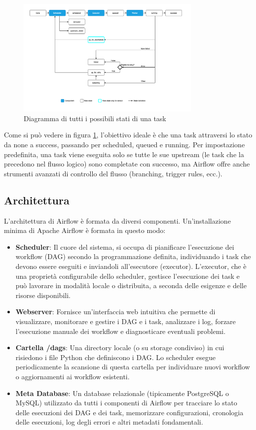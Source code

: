 \begin{figure}[h]
    \centering
    \includegraphics[width=0.8\textwidth]{img/task_lifecycle_diagram.png}
    \caption{Diagramma di tutti i possibili stati di una task}
    \label{fig:task_lifecycle}
\end{figure}

Come si può vedere in figura \ref{fig:task_lifecycle}, l'obiettivo ideale è che una task attraversi lo stato da none a success, passando per scheduled, queued e running. Per impostazione predefinita, una task viene eseguita solo se tutte le sue upstream (le task che la precedono nel flusso logico) sono completate con successo, ma Airflow offre anche strumenti avanzati di controllo del flusso (branching, trigger rules, ecc.).


\subsection{Architettura}
\label{sec:architettura}
L'architettura di Airflow è formata da diversi componenti. Un'installazione minima di Apache Airflow è formata in questo modo: 

\begin{itemize}
    \item \textbf{Scheduler}: Il cuore del sistema, si occupa di pianificare l'esecuzione dei workflow (DAG) secondo la programmazione definita, individuando i task che devono essere eseguiti e inviandoli all'esecutore (executor). L'executor, che è una proprietà configurabile dello scheduler, gestisce l'esecuzione dei task e può lavorare in modalità locale o distribuita, a seconda delle esigenze e delle risorse disponibili.
    \item \textbf{Webserver}: Fornisce un'interfaccia web intuitiva che permette di visualizzare, monitorare e gestire i DAG e i task, analizzare i log, forzare l'esecuzione manuale dei workflow e diagnosticare eventuali problemi.
    \item \textbf{Cartella /dags}: Una directory locale (o su storage condiviso) in cui risiedono i file Python che definiscono i DAG. Lo scheduler esegue periodicamente la scansione di questa cartella per individuare nuovi workflow o aggiornamenti ai workflow esistenti.
    \item \textbf{Meta Database}: Un database relazionale (tipicamente PostgreSQL o MySQL) utilizzato da tutti i componenti di Airflow per tracciare lo stato delle esecuzioni dei DAG e dei task, memorizzare configurazioni, cronologia delle esecuzioni, log degli errori e altri metadati fondamentali.
\end{itemize}

